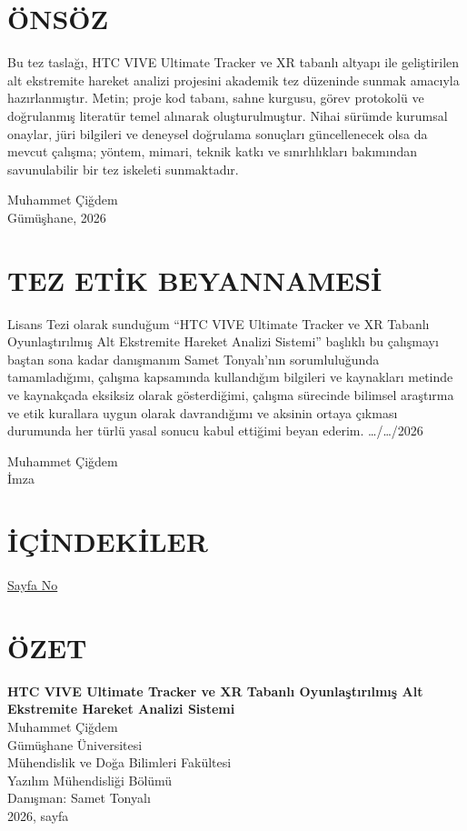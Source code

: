 \documentclass[12pt,a4paper,oneside]{report}
\makeatletter
\newcommand{\university}{Gümüşhane Üniversitesi}
\newcommand{\faculty}{Mühendislik ve Doğa Bilimleri Fakültesi}
\newcommand{\department}{Yazılım Mühendisliği Bölümü}
\newcommand{\thesistitle}{HTC VIVE Ultimate Tracker ve XR Tabanlı Oyunlaştırılmış Alt Ekstremite Hareket Analizi Sistemi}
\newcommand{\thesisauthor}{Muhammet Çiğdem}
\newcommand{\advisor}{Samet Tonyalı}
\newcommand{\thesiscity}{Gümüşhane}
\newcommand{\pageNoLabel}{\noindent\hfill\underline{Sayfa No}\par\vspace{0.75\baselineskip}}
\newcommand{\customtableofcontents}{%
	\chapter*{İÇİNDEKİLER}
	\addcontentsline{toc}{chapter}{İÇİNDEKİLER}
	\pageNoLabel
	\@starttoc{toc}}
\makeatother
\begin{document}
\clearpage
{}
\setcounter{page}{4}

\chapter*{ÖNSÖZ}
Bu tez taslağı, HTC VIVE Ultimate Tracker ve XR tabanlı altyapı ile geliştirilen alt ekstremite hareket analizi projesini akademik tez düzeninde sunmak amacıyla hazırlanmıştır. Metin; proje kod tabanı, sahne kurgusu, görev protokolü ve doğrulanmış literatür temel alınarak oluşturulmuştur. Nihai sürümde kurumsal onaylar, jüri bilgileri ve deneysel doğrulama sonuçları güncellenecek olsa da mevcut çalışma; yöntem, mimari, teknik katkı ve sınırlılıkları bakımından savunulabilir bir tez iskeleti sunmaktadır.

\vspace{2cm}
\begin{flushright}
\thesisauthor \\
\thesiscity, 2026
\end{flushright}

\chapter*{TEZ ETİK BEYANNAMESİ}
Lisans Tezi olarak sunduğum ``\thesistitle'' başlıklı bu çalışmayı baştan sona kadar danışmanım \advisor'nın sorumluluğunda tamamladığımı, çalışma kapsamında kullandığım bilgileri ve kaynakları metinde ve kaynakçada eksiksiz olarak gösterdiğimi, çalışma sürecinde bilimsel araştırma ve etik kurallara uygun olarak davrandığımı ve aksinin ortaya çıkması durumunda her türlü yasal sonucu kabul ettiğimi beyan ederim. \ldots/\ldots/2026

\vspace{2cm}
\begin{flushright}
\thesisauthor\\[0.6cm]
İmza
\end{flushright}

\customtableofcontents
\clearpage

\chapter*{ÖZET}
\begin{center}
\textbf{HTC VIVE Ultimate Tracker ve XR Tabanlı Oyunlaştırılmış Alt Ekstremite Hareket Analizi Sistemi}\\[0.5em]
\thesisauthor\\
\university\\
\faculty\\
\department\\
Danışman: \advisor\\
2026, \pageref{LastPage} sayfa
\end{center}
\end{document}
